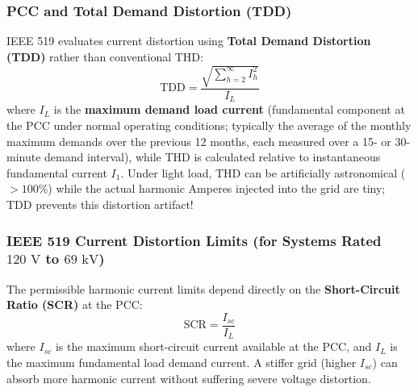 \documentclass[11pt,a4paper]{article}
\begin{document}
\subsubsection{PCC and Total Demand Distortion (TDD)}
IEEE 519 evaluates current distortion using \textbf{Total Demand Distortion (TDD)} rather than conventional THD:
\begin{equation}
\text{TDD} = \frac{\sqrt{\sum_{h=2}^\infty I_h^2}}{I_L}
\end{equation}
where $I_L$ is the \textbf{maximum demand load current} (fundamental component at the PCC under normal operating conditions; typically the average of the monthly maximum demands over the previous 12 months, each measured over a 15- or 30-minute demand interval), while THD is calculated relative to instantaneous fundamental current $I_1$. Under light load, THD can be artificially astronomical ($>100\%$) while the actual harmonic Amperes injected into the grid are tiny; TDD prevents this distortion artifact!

\subsubsection{IEEE 519 Current Distortion Limits (for Systems Rated $120\text{ V}$ to $69\text{ kV}$)}
The permissible harmonic current limits depend directly on the \textbf{Short-Circuit Ratio (SCR)} at the PCC:
\begin{equation}
\text{SCR} = \frac{I_{sc}}{I_L}
\end{equation}
where $I_{sc}$ is the maximum short-circuit current available at the PCC, and $I_L$ is the maximum fundamental load demand current. A stiffer grid (higher $I_{sc}$) can absorb more harmonic current without suffering severe voltage distortion.
\end{document}
